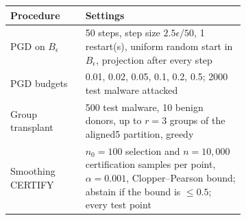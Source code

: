\begin{tabular}{lp{0.68\linewidth}}
\toprule
Procedure & Settings \\
\midrule
PGD on $B_\epsilon$ & 50 steps, step size $2.5\epsilon/50$, 1 restart(s), uniform random start in $B_\epsilon$, projection after every step \\
PGD budgets & 0.01, 0.02, 0.05, 0.1, 0.2, 0.5; 2000 test malware attacked \\
Group transplant & 500 test malware, 10 benign donors, up to $r=3$ groups of the aligned5 partition, greedy \\
Smoothing CERTIFY & $n_0=100$ selection and $n=10,000$ certification samples per point, $\alpha=0.001$, Clopper--Pearson bound; abstain if the bound is $\le 0.5$; every test point \\
\bottomrule
\end{tabular}